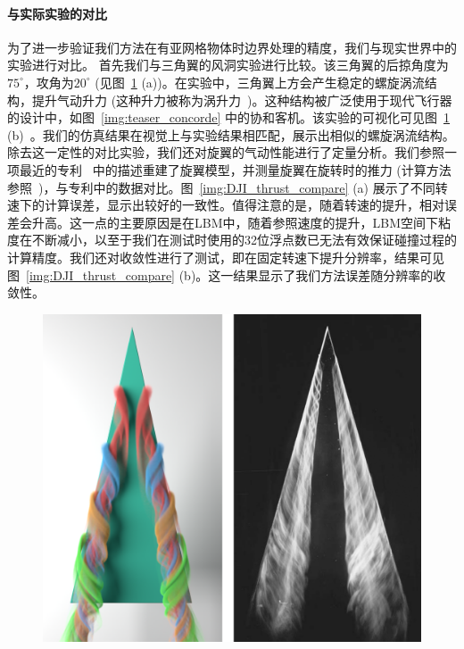 \paragraph{与实际实验的对比}
为了进一步验证我们方法在有亚网格物体时边界处理的精度，我们与现实世界中的实验进行对比。
首先我们与三角翼的风洞实验进行比较。该三角翼的后掠角度为$75^\circ$，攻角为$20^\circ$ (见图~\ref{img:comparison_delta_wing} (a))。在实验中，三角翼上方会产生稳定的螺旋涡流结构，提升气动升力 (这种升力被称为涡升力~\cite{anderson2010aircraft})。这种结构被广泛使用于现代飞行器的设计中，如图~\ref{img:teaser_concorde} 中的协和客机。该实验的可视化可见图~\ref{img:comparison_delta_wing} (b)~\cite{Delery:2001}。我们的仿真结果在视觉上与实验结果相匹配，展示出相似的螺旋涡流结构。除去这一定性的对比实验，我们还对旋翼的气动性能进行了定量分析。我们参照一项最近的专利~\cite{lin2020screw} 中的描述重建了旋翼模型，并测量旋翼在旋转时的推力 (计算方法参照~\cite{leishman_2016})，与专利中的数据对比。图~\ref{img:DJI_thrust_compare} (a) 展示了不同转速下的计算误差，显示出较好的一致性。值得注意的是，随着转速的提升，相对误差会升高。这一点的主要原因是在LBM中，随着参照速度的提升，LBM空间下粘度在不断减小，以至于我们在测试时使用的32位浮点数已无法有效保证碰撞过程的计算精度。我们还对收敛性进行了测试，即在固定转速下提升分辨率，结果可见图~\ref{img:DJI_thrust_compare} (b)。这一结果显示了我们方法误差随分辨率的收敛性。

\begin{figure}[htb]
  \centering
    \includegraphics[width=0.99\columnwidth]{figures/comparison_delta_wing.png}
  \label{img:comparison_delta_wing}
\end{figure}

